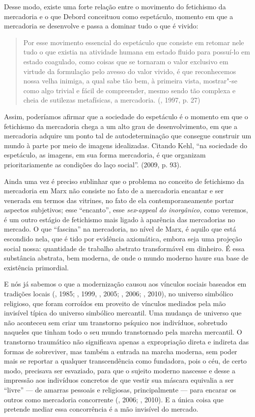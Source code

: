 Desse modo, existe uma forte relação entre o movimento do fetichismo da
mercadoria e o que Debord conceituou como espetáculo, momento em que a
mercadoria se desenvolve e passa a dominar tudo o que é vivido:

\begin{quote}
Por esse movimento essencial do espetáculo que consiste em retomar nele
tudo o que existia na atividade humana em estado fluido para possuí-lo
em estado coagulado, como coisas que se tornaram o valor exclusivo em
virtude da formulação pelo avesso do valor vivido, é que reconhecemos
nossa velha inimiga, a qual sabe tão bem, à primeira vista, mostrar"-se
como algo trivial e fácil de compreender, mesmo sendo tão complexa e
cheia de sutilezas metafísicas, a mercadoria. (, 1997, p. 27)
\end{quote}

Assim, poderíamos afirmar que a sociedade do espetáculo é o momento em
que o fetichismo da mercadoria chega a um alto grau de desenvolvimento,
em que a mercadoria adquire um ponto tal de autodeterminação que
consegue construir um mundo à parte por meio de imagens idealizadas.
Citando Kehl, ``na sociedade do espetáculo, as imagens, em sua forma
mercadoria, é que organizam prioritariamente as condições do laço
social''. (2009, p. 93).

Ainda uma vez é preciso sublinhar que o problema no conceito de
fetichismo da mercadoria em Marx não consiste no fato de a mercadoria
encantar e ser venerada em termos das vitrines, no fato de ela
contemporaneamente portar aspectos subjetivos; esse ``encanto'', esse
\emph{sex}-\emph{appeal do inorgânico,} como veremos, é um outro estágio
de fetichismo mais ligado à aparência das mercadorias no mercado. O que
``fascina'' na mercadoria, no nível de Marx, é aquilo que está escondido
nela, que é tido por evidência axiomática, embora seja uma projeção
social nossa: quantidade de trabalho abstrato transformável em dinheiro.
É essa substância abstrata, bem moderna, de onde o mundo moderno haure
sua base de existência primordial.

E nós já sabemos o que a modernização causou aos vínculos sociais
baseados em tradições locais (, 1985; , 1999, , 2005;
, 2006; , 2010), no universo simbólico religioso, que foram
corroídos em proveito de vínculos mediados pela mão invisível típica do
universo simbólico mercantil. Uma mudança de universo que não aconteceu
sem criar um transtorno psíquico nos indivíduos, sobretudo naqueles que
tinham todo o seu mundo transtornado pela marcha mercantil. O transtorno
traumático não significava apenas a expropriação direta e indireta das
formas de sobreviver, mas também a entrada na marcha moderna, sem poder
mais se reportar a qualquer transcendência como fundadora, pois o céu,
de certo modo, precisava ser esvaziado, para que o sujeito moderno
nascesse e desse a impressão aos indivíduos concretos de que vestir sua
máscara equivalia a ser ``livre'' --- de amarras pessoais e religiosas,
principalmente --- para encarar os outros como mercadoria concorrente
(, 2006; , 2010). E a única coisa que pretende mediar essa
concorrência é a mão invisível do mercado.

